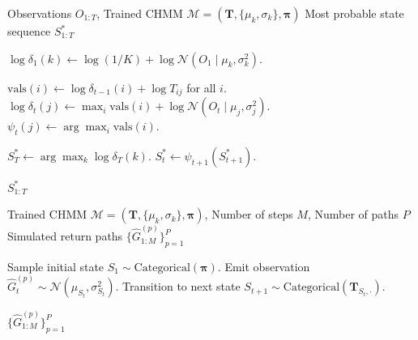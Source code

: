 \begin{algorithm}[tp]
\caption{Viterbi decoding for the most likely hidden state sequence}
\label{alg:viterbi}
\small
\begin{algorithmic}[1]
\REQUIRE Observations $O_{1:T}$, Trained CHMM $\mathcal{M} = (\mathbf{T}, \{\mu_k, \sigma_k\}, \boldsymbol{\pi})$
\ENSURE Most probable state sequence $S_{1:T}^*$

    \STATE $\log \delta_1(k) \leftarrow \log(1/K) + \log \mathcal{N}(O_1 \mid \mu_k, \sigma_k^2)$.
\ENDFOR

        \STATE $\text{vals}(i) \leftarrow \log \delta_{t-1}(i) + \log T_{ij}$ for all $i$.
        \STATE $\log \delta_t(j) \leftarrow \max_i \text{vals}(i) + \log \mathcal{N}(O_t \mid \mu_j, \sigma_j^2)$.
        \STATE $\psi_t(j) \leftarrow \arg\max_i \text{vals}(i)$.
    \ENDFOR
\ENDFOR

\STATE $S_T^* \leftarrow \arg\max_k \log \delta_T(k)$.
    \STATE $S_t^* \leftarrow \psi_{t+1}(S_{t+1}^*)$.
\ENDFOR

\RETURN $S_{1:T}^*$
\end{algorithmic}
\end{algorithm}

\begin{algorithm}[tp]
\caption{CHMM simulation of synthetic excess growth rate paths}
\label{alg:chmm_simulate}
\small
\begin{algorithmic}[1]
\REQUIRE Trained CHMM $\mathcal{M} = (\mathbf{T}, \{\mu_k, \sigma_k\}, \boldsymbol{\pi})$, Number of steps $M$, Number of paths $P$
\ENSURE Simulated return paths $\{\hat{G}^{(p)}_{1:M}\}_{p=1}^{P}$

    \STATE Sample initial state $S_1 \sim \text{Categorical}(\boldsymbol{\pi})$.
        \STATE Emit observation $\hat{G}_t^{(p)} \sim \mathcal{N}(\mu_{S_t}, \sigma_{S_t}^2)$.
            \STATE Transition to next state $S_{t+1} \sim \text{Categorical}(\mathbf{T}_{S_t, \cdot})$.
        \ENDIF
    \ENDFOR
\ENDFOR

\RETURN $\{\hat{G}^{(p)}_{1:M}\}_{p=1}^{P}$
\end{algorithmic}
\end{algorithm}

